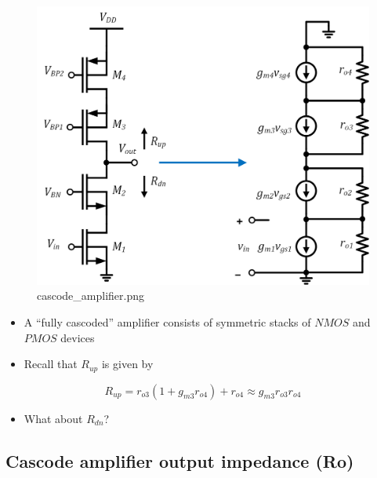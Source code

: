 \documentclass[11pt]{article}
\providecommand{\tightlist}{%
      \setlength{\itemsep}{0pt}\setlength{\parskip}{0pt}}
\begin{document}
    \begin{figure}
\centering
\includegraphics{cascode_amplifier.png}
\caption{cascode\_amplifier.png}
\end{figure}

    \begin{itemize}
\tightlist
\item
  A ``fully cascoded'' amplifier consists of symmetric stacks of
  \(NMOS\) and \(PMOS\) devices
\item
  Recall that \(R_{up}\) is given by
\end{itemize}

\begin{equation}
R_{up} = r_{o3}(1+g_{m3} r_{o4}) + r_{o4} \approx g_{m3}r_{o3}r_{o4}
\end{equation}

\begin{itemize}
\tightlist
\item
  What about \(R_{dn}\)?
\end{itemize}

    \hypertarget{cascode-amplifier-output-impedance-ro}{%
\subsection{Cascode amplifier output impedance
(Ro)}\label{cascode-amplifier-output-impedance-ro}}
\end{document}
